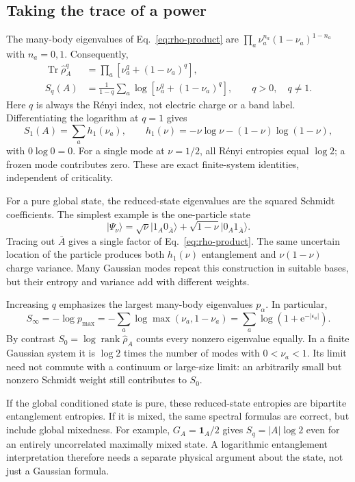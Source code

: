 \documentclass[aps,prb,onecolumn,nofootinbib,superscriptaddress]{revtex4-2}
\newcommand{\Id}{\mathbf{1}}
\newcommand{\Tr}{\operatorname{Tr}}
\newcommand{\e}{\mathrm{e}}
\newcommand{\ket}[1]{\lvert #1\rangle}
\begin{document}
\subsection{Taking the trace of a power}
The many-body eigenvalues of Eq.~\eqref{eq:rho-product} are
$\prod_a\nu_a^{n_a}(1-\nu_a)^{1-n_a}$ with $n_a=0,1$. Consequently,
\begin{align}
 \Tr\hat\rho_A^q
 &=\prod_a[\nu_a^q+(1-\nu_a)^q],\\
 S_q(A)&=\frac{1}{1-q}\sum_a
       \log[\nu_a^q+(1-\nu_a)^q],\qquad q>0,\quad q\ne1 .
 \label{eq:renyi}
\end{align}
Here $q$ is always the R\'enyi index, not electric charge or a band label.
Differentiating the logarithm at $q=1$ gives
\begin{equation}
 S_1(A)=\sum_a h_1(\nu_a),\qquad
 h_1(\nu)=-\nu\log\nu-(1-\nu)\log(1-\nu),
 \label{eq:von-neumann}
\end{equation}
with $0\log0=0$. For a single mode at $\nu=1/2$, all R\'enyi entropies
equal $\log2$; a frozen mode contributes zero. These are exact finite-system
identities, independent of criticality.

For a pure global state, the reduced-state eigenvalues are the squared
Schmidt coefficients. The simplest example is the one-particle state
\begin{equation}
 \ket{\Psi_\nu}=\sqrt\nu\ket{1_A0_{\bar A}}
             +\sqrt{1-\nu}\ket{0_A1_{\bar A}}.
 \label{eq:schmidt-pair}
\end{equation}
Tracing out $\bar A$ gives a single factor of
Eq.~\eqref{eq:rho-product}. The same uncertain location of the particle
produces both $h_1(\nu)$ entanglement and $\nu(1-\nu)$ charge variance.
Many Gaussian modes repeat this construction in suitable bases, but
their entropy and variance add with different weights.

Increasing $q$ emphasizes the largest many-body eigenvalues $p_\alpha$.
In particular,
\begin{equation}
 S_\infty=-\log p_{\max}
 =-\sum_a\log\max(\nu_a,1-\nu_a)
 =\sum_a\log(1+\e^{-|\epsilon_a|}).
 \label{eq:single-copy}
\end{equation}
By contrast $S_0=\log\operatorname{rank}\hat\rho_A$ counts every
nonzero eigenvalue equally. In a finite Gaussian system it is $\log2$
times the number of modes with $0<\nu_a<1$. Its limit need not commute
with a continuum or large-size limit: an arbitrarily small but nonzero
Schmidt weight still contributes to $S_0$.

If the global conditioned state is pure, these reduced-state entropies are
bipartite entanglement entropies. If it is mixed, the same spectral formulas
are correct, but include global mixedness. For example,
$G_A=\Id_A/2$ gives $S_q=|A|\log2$ even for an entirely uncorrelated
maximally mixed state. A logarithmic entanglement interpretation therefore
needs a separate physical argument about the state, not just a Gaussian
formula.
\end{document}
